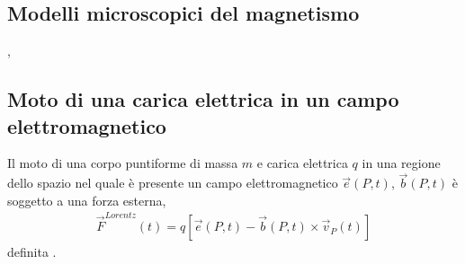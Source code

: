 \documentclass[letterpaper,10pt,italian]{jupyterBook}
\begin{document}
\subsection{Modelli microscopici del magnetismo}
\label{\detokenize{ch/electromagnetism/electromagnetism-steady:modelli-microscopici-del-magnetismo}}\label{\detokenize{ch/electromagnetism/electromagnetism-steady:physics-hs-electromagnetism-magnetism-micro}}
\sphinxAtStartPar
{}  , 

\sphinxAtStartPar
{}

\sphinxAtStartPar
{} 


\subsection{Moto di una carica elettrica in un campo elettromagnetico}
\label{\detokenize{ch/electromagnetism/electromagnetism-steady:moto-di-una-carica-elettrica-in-un-campo-elettromagnetico}}\label{\detokenize{ch/electromagnetism/electromagnetism-steady:physics-hs-electromagnetism-lorentz}}
\sphinxAtStartPar
Il moto di una corpo puntiforme di massa \(m\) e carica elettrica \(q\) in una regione dello spazio nel quale è presente un campo elettromagnetico \(\vec{e}(P, t)\), \(\vec{b}(P,t)\) è soggetto a una forza esterna,
\begin{equation}\label{equation:ch/electromagnetism/electromagnetism-steady:eq:force:lorentz}
\begin{split}\vec{F}^{Lorentz}(t) = q \left[\vec{e}(P,t) - \vec{b}(P,t) \times \vec{v}_P(t) \right]\end{split}
\end{equation}
\sphinxAtStartPar
definita .
\end{document}
